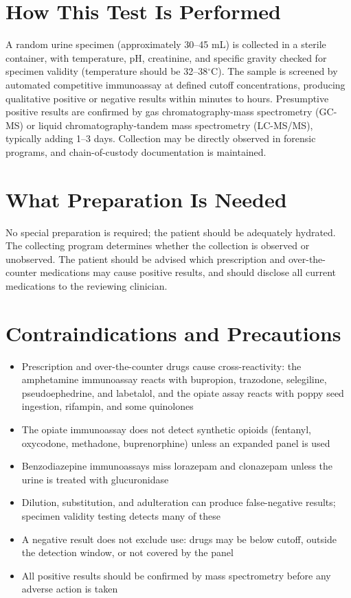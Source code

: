 \section*{How This Test Is Performed}
A random urine specimen (approximately 30--45 mL) is collected in a sterile container, with temperature, pH, creatinine, and specific gravity checked for specimen validity (temperature should be 32--38$^{\circ}$C). The sample is screened by automated competitive immunoassay at defined cutoff concentrations, producing qualitative positive or negative results within minutes to hours. Presumptive positive results are confirmed by gas chromatography-mass spectrometry (GC-MS) or liquid chromatography-tandem mass spectrometry (LC-MS/MS), typically adding 1--3 days. Collection may be directly observed in forensic programs, and chain-of-custody documentation is maintained.
\section*{What Preparation Is Needed}
No special preparation is required; the patient should be adequately hydrated. The collecting program determines whether the collection is observed or unobserved. The patient should be advised which prescription and over-the-counter medications may cause positive results, and should disclose all current medications to the reviewing clinician.
\section*{Contraindications and Precautions}
\begin{itemize}
  \item Prescription and over-the-counter drugs cause cross-reactivity: the amphetamine immunoassay reacts with bupropion, trazodone, selegiline, pseudoephedrine, and labetalol, and the opiate assay reacts with poppy seed ingestion, rifampin, and some quinolones
  \item The opiate immunoassay does not detect synthetic opioids (fentanyl, oxycodone, methadone, buprenorphine) unless an expanded panel is used
  \item Benzodiazepine immunoassays miss lorazepam and clonazepam unless the urine is treated with glucuronidase
  \item Dilution, substitution, and adulteration can produce false-negative results; specimen validity testing detects many of these
  \item A negative result does not exclude use: drugs may be below cutoff, outside the detection window, or not covered by the panel
  \item All positive results should be confirmed by mass spectrometry before any adverse action is taken
\end{itemize}
